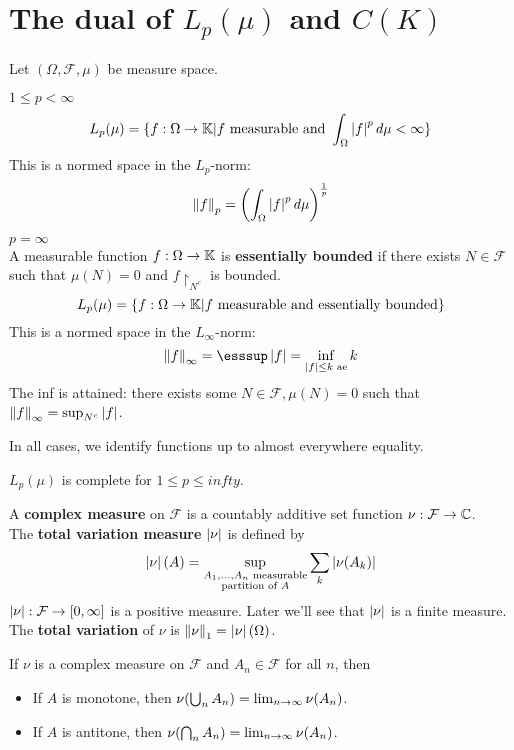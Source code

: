\documentclass{article}
\begin{document}
\clearpage

\section{The dual of \texorpdfstring{$L_p(\mu)$ and $C(K)$}{Lp(mu) or C(K)}}

Let $(\Omega, \mathcal F, \mu)$ be measure space.

$1 \le p < \infty$
$$L_p(\mu) = \{f : \Omega \rightarrow \mathbb K | f \text{ measurable and } \int_\Omega \left\lvert f\right\rvert^p d\mu < \infty\}$$
This is a normed space in the $L_p$-norm:
$$\left\lVert f\right\rVert_p = \left(\int_\Omega \left\lvert f\right\rvert^p d\mu\right)^{\frac 1p}$$

$p = \infty$ \\
A measurable function $f : \Omega \rightarrow \mathbb K$ is {\bf essentially bounded} if there exists $N \in \mathcal F$ such that $\mu(N) = 0$ and $f\restriction_{N^c}$ is bounded.
$$L_p(\mu) = \{f : \Omega \rightarrow \mathbb K | f \text{ measurable and essentially bounded}\}$$
This is a normed space in the $L_\infty$-norm:
$$\norm f_\infty = \esssup \abs f = \inf_{\abs f \le k \text{ ae}} k$$
The inf is attained: there exists some $N \in \mathcal F, \mu(N) = 0$ such that $\left\lVert f\right\rVert_\infty = \sup_{N^c} \left\lvert f\right\rvert$.

In all cases, we identify functions up to almost everywhere equality.

\begin{nthm}
  $L_p(\mu)$ is complete for $1 \le p \le infty$.
\end{nthm}

\begin{defi}
  A {\bf complex measure} on $\mathcal F$ is a countably additive set function $\nu : \mathcal F \rightarrow \mathbb C$. \\
  The {\bf total variation measure} $\left\lvert \nu\right\rvert$ is defined by
  $$\left\lvert \nu\right\rvert(A) = \sup_{\substack{A_1, \dots, A_n \text{ measurable} \\ \text{partition of } A}} \sum_k \left\lvert \nu(A_k)\right\rvert$$
  $\left\lvert \nu\right\rvert : \mathcal F \rightarrow [0, \infty]$ is a positive measure. Later we'll see that $\left\lvert \nu\right\rvert$ is a finite measure. \\
  The {\bf total variation} of $\nu$ is $\left\lVert \nu\right\rVert_1 = \left\lvert \nu\right\rvert(\Omega)$.
\end{defi}

\begin{prop}
  If $\nu$ is a complex measure on $\mathcal F$ and $A_n \in \mathcal F$ for all $n$, then
  \begin{itemize}
    \item If $A$ is monotone, then $\nu(\bigcup_n A_n) = \lim_{n \rightarrow \infty} \nu(A_n)$.
    \item If $A$ is antitone, then $\nu(\bigcap_n A_n) = \lim_{n \rightarrow \infty} \nu(A_n)$.
  \end{itemize}
\end{prop}
\end{document}
